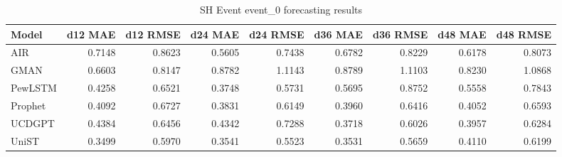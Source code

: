 \begin{table}[htbp]
\centering
\small
\caption{SH Event event\_0 forecasting results}
\label{tab:sh-event-event-0}
\begin{tabular}{lrrrrrrrr}
\toprule
Model & d12 MAE & d12 RMSE & d24 MAE & d24 RMSE & d36 MAE & d36 RMSE & d48 MAE & d48 RMSE \\
\midrule
AIR & 0.7148 & 0.8623 & 0.5605 & 0.7438 & 0.6782 & 0.8229 & 0.6178 & 0.8073 \\
GMAN & 0.6603 & 0.8147 & 0.8782 & 1.1143 & 0.8789 & 1.1103 & 0.8230 & 1.0868 \\
PewLSTM & 0.4258 & 0.6521 & 0.3748 & 0.5731 & 0.5695 & 0.8752 & 0.5558 & 0.7843 \\
Prophet & 0.4092 & 0.6727 & 0.3831 & 0.6149 & 0.3960 & 0.6416 & 0.4052 & 0.6593 \\
UCDGPT & 0.4384 & 0.6456 & 0.4342 & 0.7288 & 0.3718 & 0.6026 & 0.3957 & 0.6284 \\
UniST & 0.3499 & 0.5970 & 0.3541 & 0.5523 & 0.3531 & 0.5659 & 0.4110 & 0.6199 \\
\bottomrule
\end{tabular}
\end{table}
